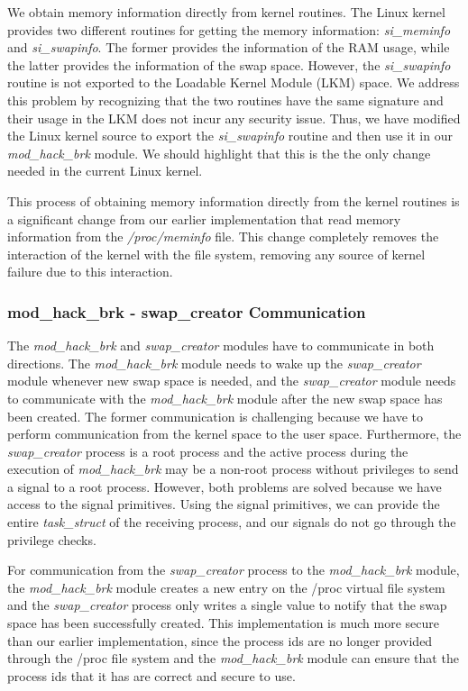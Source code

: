 We obtain memory information directly from kernel routines. The Linux
kernel provides two different routines for getting the memory information:
{\it si\_meminfo} and {\it si\_swapinfo}. The former provides the
information of the RAM usage, while the latter provides the information of
the swap space. However, the {\it si\_swapinfo} routine is not exported to
the Loadable Kernel Module (LKM) space. We address this problem by
recognizing that the two routines have the same signature and their usage
in the LKM does not incur any security issue. Thus, we have modified the
Linux kernel source to export the {\it si\_swapinfo} routine and then use
it in our {\it mod\_hack\_brk} module. We should highlight that this is the
the only change needed in the current Linux kernel.

This process of obtaining memory information directly from the kernel
routines is a significant change from our earlier implementation that read
memory information from the {\it /proc/meminfo} file. This change completely
removes the interaction of the kernel with the file system, removing any
source of kernel failure due to this interaction.

\subsubsection{mod\_hack\_brk - swap\_creator Communication}

The {\it mod\_hack\_brk} and {\it swap\_creator} modules have to communicate
in both directions. The {\it mod\_hack\_brk} module needs to wake up
the {\it swap\_creator} module whenever new swap space is needed, and the
{\it swap\_creator} module needs to communicate with the
{\it mod\_hack\_brk} module after the new swap space has been created.
The former communication is challenging because we have to perform
communication from the kernel space to the user space. Furthermore, the
{\it swap\_creator} process is a root process and the active process during
the execution of {\it mod\_hack\_brk} may be a non-root process without
privileges to send a signal to a root process. However, both problems are
solved because we have access to the signal primitives. Using the signal
primitives, we can provide the entire {\it task\_struct} of the receiving
process, and our signals do not go through the privilege checks.

For communication from the {\it swap\_creator} process to the
{\it mod\_hack\_brk} module, the {\it mod\_hack\_brk} module creates a
new entry on the /proc virtual file system and the {\it swap\_creator} process only
writes a single value to notify that the swap space has been successfully
created. This implementation is much more secure than our earlier
implementation, since the process ids are no longer provided through the
/proc file system and the {\it mod\_hack\_brk} module can ensure that the
process ids that it has are correct and secure to use.

